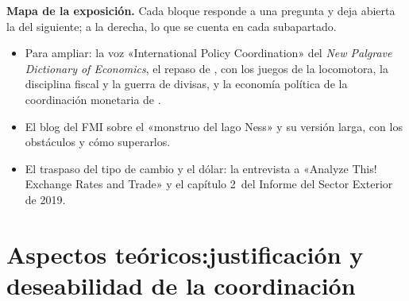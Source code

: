 \documentclass[11pt]{article}
\begin{document}
\begin{anotaciones}
\textbf{Mapa de la exposición.} Cada bloque responde a una pregunta y deja abierta la del siguiente; a la derecha, lo que se cuenta en cada subapartado.
\begin{infografiacaja}
\caption{Mapa del tema: la pregunta de cada bloque, sus subapartados y el hilo que los une}\label{figu:mapa-tema}
\end{infografiacaja}
\end{anotaciones}



\begin{anotaciones}
\begin{itemize}
\item Para ampliar: la voz «International Policy Coordination» del \emph{New Palgrave Dictionary of Economics}\nocite{Bergin2008Palgrave}, el repaso de \textcite{Frankel2016Coordination}, con los juegos de la locomotora, la disciplina fiscal y la guerra de divisas, y la economía política de la coordinación monetaria de \textcite{BrozFrieden2013}.
\item El blog del FMI sobre el «monstruo del lago Ness»\nocite{BlanchardOstryGhosh2013} y su versión larga, con los obstáculos y cómo superarlos\nocite{OstryGhosh2013}.
\item El traspaso del tipo de cambio y el dólar: la entrevista a  «Analyze This! Exchange Rates and Trade»\nocite{FMIAnalyzeThisGopinath} y el capítulo 2~del Informe del Sector Exterior de 2019\nocite{FMI2019ESR}.
\end{itemize}
\end{anotaciones}


\section{Aspectos teóricos:\cortetitulo justificación y deseabilidad de la coordinación}\label{sec:teoria}
\end{document}
